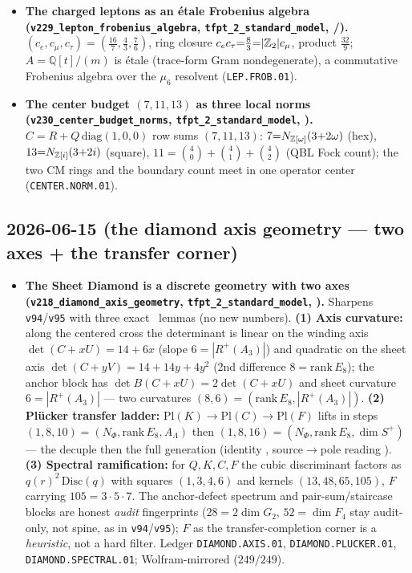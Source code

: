 \begin{itemize}
\item \textbf{The charged leptons as an \'etale Frobenius algebra (\texttt{v229\_lepton\_frobenius\_algebra},
  \texttt{tfpt\_2\_standard\_model}, \mE/\mC).} $(c_e,c_\mu,c_\tau){=}(\tfrac{16}7,\tfrac43,\tfrac76)$,
  ring closure $c_e c_\tau{=}\tfrac83{=}|\mathbb{Z}_2|c_\mu$, product $\tfrac{32}9$; $A{=}\mathbb Q[t]/(m)$ is \'etale
  (trace-form Gram nondegenerate), a commutative Frobenius algebra over the $\mu_6$ resolvent
  (\texttt{LEP.FROB.01}).
\item \textbf{The center budget $(7,11,13)$ as three local norms (\texttt{v230\_center\_budget\_norms},
  \texttt{tfpt\_2\_standard\_model}, \mE).} $C{=}R{+}Q\,\mathrm{diag}(1,0,0)$ row sums $(7,11,13)$:
  $7{=}N_{\mathbb{Z}[\omega]}(3{+}2\omega)$ (hex), $13{=}N_{\mathbb{Z}[i]}(3{+}2i)$ (square), $11{=}\binom40{+}\binom41{+}\binom42$
  (QBL Fock count); the two CM rings and the boundary count meet in one operator center
  (\texttt{CENTER.NORM.01}).
\end{itemize}

\subsection*{2026-06-15 (the diamond axis geometry --- two axes + the transfer corner)}
\begin{itemize}
\item \textbf{The Sheet Diamond is a discrete geometry with two axes
  (\texttt{v218\_diamond\_axis\_geometry}, \texttt{tfpt\_2\_standard\_model}, \mE).} Sharpens
  \texttt{v94}/\texttt{v95} with three exact \mE\ lemmas (no new numbers). \textbf{(1) Axis curvature:}
  along the centered cross the determinant is linear on the winding axis $\det(C{+}xU)=14{+}6x$ (slope
  $6{=}|R^+(A_3)|$) and quadratic on the sheet axis $\det(C{+}yV)=14{+}14y{+}4y^2$ (2nd difference
  $8{=}\mathrm{rank}\,E_8$); the anchor block has $\det B(C{+}xU)=2\det(C{+}xU)$ and sheet curvature
  $6{=}|R^+(A_3)|$ --- two curvatures $(8,6)=(\mathrm{rank}\,E_8,|R^+(A_3)|)$. \textbf{(2) Pl\"ucker
  transfer ladder:} $\mathrm{Pl}(K)\to\mathrm{Pl}(C)\to\mathrm{Pl}(F)$ lifts in steps
  $(1,8,10)=(N_\Phi,\mathrm{rank}\,E_8,A_\Lambda)$ then $(1,8,16)=(N_\Phi,\mathrm{rank}\,E_8,\dim S^+)$ ---
  the decuple then the full generation (identity \mE, source$\to$pole reading \mC). \textbf{(3) Spectral
  ramification:} for $Q,K,C,F$ the cubic discriminant factors as $q(r)^2\,\mathrm{Disc}(q)$ with squares
  $(1,3,4,6)$ and kernels $(13,48,65,105)$, $F$ carrying $105=3{\cdot}5{\cdot}7$. The anchor-defect
  spectrum and pair-sum/staircase blocks are honest \emph{audit} fingerprints ($28{=}2\dim G_2$,
  $52{=}\dim F_4$ stay audit-only, not spine, as in \texttt{v94}/\texttt{v95}); $F$ as the
  transfer-completion corner is a \emph{heuristic}, not a hard filter. Ledger \texttt{DIAMOND.AXIS.01},
  \texttt{DIAMOND.PLUCKER.01}, \texttt{DIAMOND.SPECTRAL.01}; Wolfram-mirrored ($249/249$).
\end{itemize}

